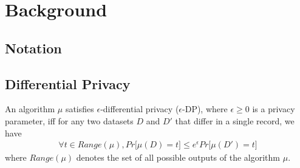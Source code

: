 
\section{Background}
\subsection{Notation}

\subsection{Differential Privacy}
\begin{definition} An algorithm $\mu$
satisfies $\epsilon$-differential privacy ($\epsilon$-DP), where $\epsilon \geq 0$ is a privacy parameter, iff
 for any two datasets $D$ and $D'$ that differ in a single record, we have
\begin{gather}
\forall t \in Range(\mu), Pr \big[\mu(D) = t\big] \leq e^{\epsilon}Pr\big[\mu(D') = t\big]
\end{gather}
where $Range(\mu)$ denotes the set of all possible outputs
of the algorithm $\mu$.
\end{definition}


